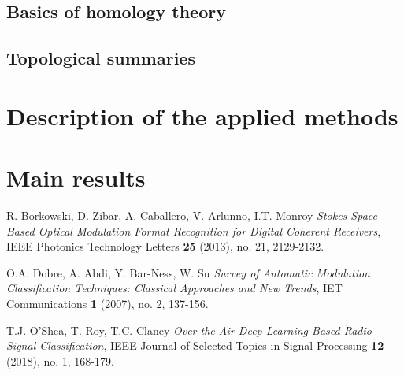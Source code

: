 \documentclass[12pt]{article}
\theoremstyle{plain}
\theoremstyle{definition}
\theoremstyle{remark}
\begin{document}
	\subsection{Basics of homology theory}
	
	\subsection{Topological summaries}
	
	\section{Description of the applied methods}
	
	\section{Main results}
	
	\begin{thebibliography}{10}
		
		R. Borkowski, D. Zibar, A. Caballero, V. Arlunno, I.T. Monroy \emph{Stokes Space-Based Optical Modulation Format Recognition for Digital Coherent Receivers}, IEEE Photonics Technology Letters {\bf 25} (2013), no. 21, 2129-2132.
		
		O.A. Dobre, A. Abdi, Y. Bar-Ness, W. Su \emph{Survey of Automatic Modulation Classification Techniques: Classical Approaches and New Trends}, IET Communications {\bf 1} (2007), no. 2, 137-156.
		
		T.J. O'Shea, T. Roy, T.C. Clancy \emph{Over the Air Deep Learning Based Radio Signal Classification}, IEEE Journal of Selected Topics in Signal Processing {\bf 12} (2018), no. 1, 168-179.
		
	\end{thebibliography}
	
	
	
\end{document}

